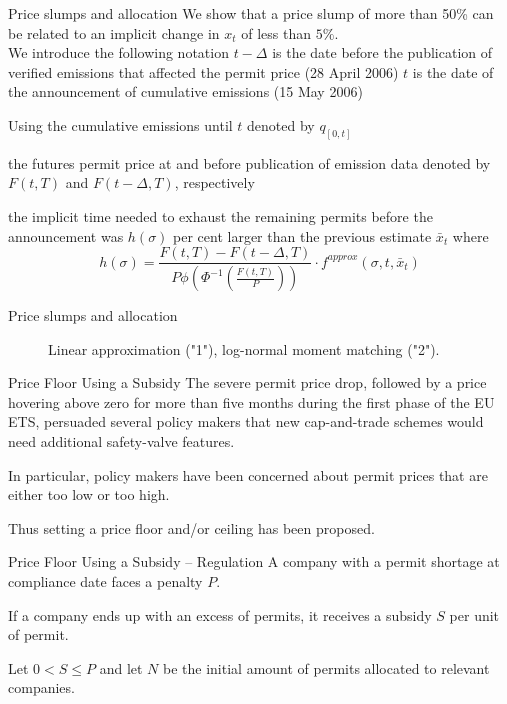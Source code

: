 Price slumps and allocation
	We show that a price slump of more than 50\% can be related to an implicit change in $x_t$ of less than $5\%$.\\

	We introduce the following notation
		$t - \Delta$ is the date before the publication of verified emissions that affected the permit price (28 April 2006)
		$t$ is the date of the announcement of cumulative emissions (15 May 2006)
	
	Using
		the cumulative emissions until $t$ denoted by $q_{[0,t]}$
		
		the futures permit price at and before publication of emission data denoted by $F(t,T)$ and $F(t - \Delta,T)$, respectively

		the implicit time needed to exhaust the remaining permits before the announcement was $h(\sigma)$ per cent larger than the previous estimate $\bar{x}_t$ where
		$$
		h(\sigma) = \frac{F(t,T) - F(t-\Delta,T)}{P \phi\left( \Phi^{-1}\left(\frac{F(t,T)}{P}\right) \right)} \cdot f^{approx}(\sigma,t,\bar{x}_t)
		$$


Price slumps and allocation
\begin{center}
\begin{figure}[h!]
\centering
{}
\caption{Linear approximation ("1"), log-normal moment matching ("2").}
\label{fig:plot11}
\end{figure}
\end{center}


Price Floor Using a Subsidy
	The severe permit price drop, followed by a price hovering above zero for more than five months
	during the first phase of the EU ETS, persuaded several policy makers that new cap-and-trade
	schemes would need additional safety-valve features.
	
	In particular, policy makers have been concerned about permit prices that are either too low or too high.
	
	Thus setting a price floor and/or ceiling has been proposed.



Price Floor Using a Subsidy -- Regulation
	A company with a permit shortage at compliance date faces a penalty $P$.
	
	If a company ends up with an excess of permits, it receives a subsidy $S$ per unit of permit.
	
	Let $0<S\leq P$ and let $N$ be the initial amount of permits allocated to relevant companies.


